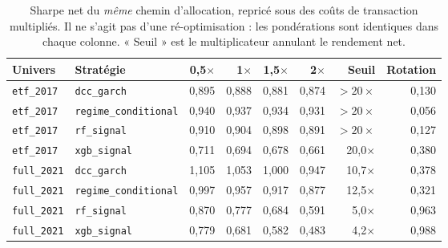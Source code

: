 \begin{table}[htbp]
  \centering
  \small
  \caption[Sensibilité aux coûts]{Sharpe net du \emph{même} chemin d'allocation, repricé sous des coûts de transaction multipliés. Il ne s'agit pas d'une ré-optimisation : les pondérations sont identiques dans chaque colonne. « Seuil » est le multiplicateur annulant le rendement net.}
  \label{tab:couts}
  \begin{tabular}{@{}llrrrrrr@{}}
    \toprule
    Univers & Stratégie & 0,5$\times$ & 1$\times$ & 1,5$\times$ & 2$\times$ & Seuil & Rotation \\
    \midrule
    \texttt{etf\_2017} & \texttt{dcc\_garch} & 0,895 & 0,888 & 0,881 & 0,874 & $>20\times$ & 0,130 \\
    \texttt{etf\_2017} & \texttt{regime\_conditional} & 0,940 & 0,937 & 0,934 & 0,931 & $>20\times$ & 0,056 \\
    \texttt{etf\_2017} & \texttt{rf\_signal} & 0,910 & 0,904 & 0,898 & 0,891 & $>20\times$ & 0,127 \\
    \texttt{etf\_2017} & \texttt{xgb\_signal} & 0,711 & 0,694 & 0,678 & 0,661 & 20,0$\times$ & 0,380 \\
    \texttt{full\_2021} & \texttt{dcc\_garch} & 1,105 & 1,053 & 1,000 & 0,947 & 10,7$\times$ & 0,378 \\
    \texttt{full\_2021} & \texttt{regime\_conditional} & 0,997 & 0,957 & 0,917 & 0,877 & 12,5$\times$ & 0,321 \\
    \texttt{full\_2021} & \texttt{rf\_signal} & 0,870 & 0,777 & 0,684 & 0,591 & 5,0$\times$ & 0,963 \\
    \texttt{full\_2021} & \texttt{xgb\_signal} & 0,779 & 0,681 & 0,582 & 0,483 & 4,2$\times$ & 0,988 \\
    \bottomrule
  \end{tabular}
\end{table}

